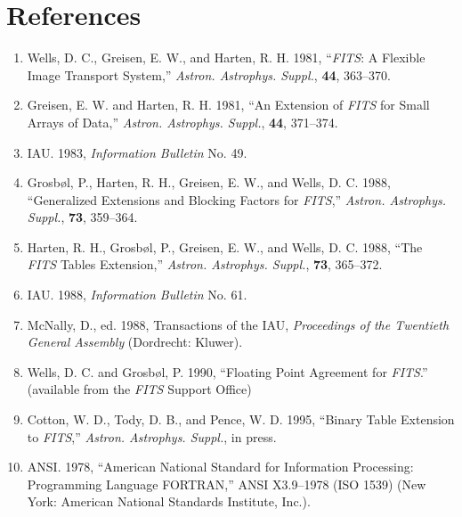 \chapter{References}
  
\begin{enumerate}
  
\item Wells, D. C., Greisen, E. W., and Harten, R. H. 1981, 
 ``{\em FITS\/}: A Flexible Image Transport System,'' 
 {\em Astron. Astrophys. Suppl.}, {\bf 44}, 363--370.
  
\item Greisen, E. W. and Harten, R. H. 1981, ``An Extension of 
  {\em FITS\/} for Small Arrays of Data,'' 
  {\em Astron. Astrophys. Suppl.}, {\bf 44}, 371--374.
    

\item IAU. 1983, {\em Information Bulletin} No. 49.
          
\item Grosb\o l, P., Harten, R. H., Greisen, E. W., and Wells, D. C. 1988,
   ``Generalized Extensions and Blocking Factors for {\em FITS},'' 
 {\em Astron. Astrophys. Suppl.}, {\bf 73}, 359--364.
  
\item Harten, R. H., Grosb\o l, P., Greisen, E. W., and Wells, D. C. 1988, 
   ``The {\em FITS\/} Tables Extension,'' 
   {\em Astron. Astrophys. Suppl.}, {\bf 73}, 365--372.

\item IAU. 1988, {\em Information Bulletin} No. 61.

\item McNally, D., ed. 1988, Transactions
 of the IAU, {\em Proceedings of 
 the Twentieth General Assembly} (Dordrecht: Kluwer). 
  
\item Wells, D. C. and Grosb\o l, P. 1990, ``Floating Point Agreement
   for
   {\em FITS}.''  (available from the {\em FITS\/} Support Office) 

\item Cotton, W. D., Tody, D. B., and Pence, W. D. 1995, ``Binary 
    Table Extension to {\em FITS},'' 
    {\em Astron. Astrophys. Suppl.}, in press.
  
\item ANSI. 1978, ``American National Standard for Information Processing:
       Programming Language FORTRAN,''
      ANSI X3.9--1978 (ISO 1539) (New York: American 
      National
      Standards Institute, Inc.).


\end{enumerate}

